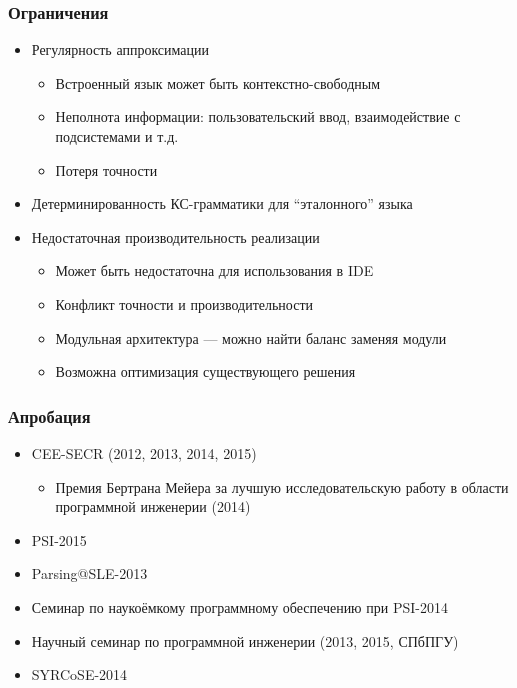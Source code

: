\documentclass{beamer}
\begin{document}
\begin{frame}[t]
    \transwipe[direction=90]
    \frametitle{Ограничения}
    \begin{itemize}
        \item Регулярность аппроксимации
        \begin{itemize}
          \item Встроенный язык может быть контекстно-свободным
          \item Неполнота информации: пользовательский ввод, взаимодействие с подсистемами и т.д.
          \item Потеря точности
        \end{itemize}
        \item Детерминированность КС-грамматики для ``эталонного'' языка 
        \item Недостаточная производительность реализации
        \begin{itemize}
          \item Может быть недостаточна для использования в IDE
          \item Конфликт точности и производительности
          \item Модульная архитектура --- можно найти баланс заменяя модули
          \item Возможна оптимизация существующего решения
        \end{itemize}
    \end{itemize}
\end{frame}

\begin{frame}
    \transwipe[direction=90]
    \frametitle{Апробация}
  \begin{itemize}
          \item CEE-SECR (2012, 2013, 2014, 2015)
          \begin{itemize}
              \item Премия Бертрана Мейера за лучшую исследовательскую работу в области программной 
инженерии (2014)
          \end{itemize}
          \item PSI-2015 
          \item Parsing@SLE-2013
          \item Семинар по наукоёмкому программному обеспечению при PSI-2014
          \item Научный семинар по программной инженерии (2013, 2015, СПбПГУ)
          \item SYRCoSE-2014          
  \end{itemize} 
\end{frame}
\end{document}
